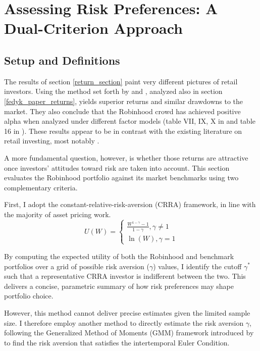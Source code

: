 \section{Assessing Risk Preferences: A Dual-Criterion Approach}
\subsection{Setup and Definitions}
The results of section \ref{return_section} paint very different pictures of retail investors. 
Using the method set forth by \cite{Welch2022} and \cite{Fedyk2024}, analyzed also in section \ref{fedyk_paper_returns}, yields superior returns and similar drawdowns to the market.
They also conclude that the Robinhood crowd has achieved positive alpha when analyzed under different factor models (table VII, IX, X in \cite{Welch2022} and table 16 in \cite{Fedyk2024}). 
These results appear to be in contrast with the existing literature on retail investing, most notably \cite{BarberOdean2000}.

A more fundamental question, however, is whether those returns are attractive once investors' attitudes toward risk are taken into account.
This section evaluates the Robinhood portfolio against its market benchmarks using two complementary criteria.

First, I adopt the constant-relative-risk-aversion (CRRA) framework, in line with the majority of asset pricing work.
\begin{equation}
    U(W) = 
    \begin{cases}
    \frac{W^{1-\gamma}-1}{1-\gamma}, \gamma\neq 1\\
    \ln(W), \gamma = 1
    \end{cases}
    \label{CRRA}
\end{equation}

By computing the expected utility of both the Robinhood and benchmark portfolios over a grid of possible risk aversion ($\gamma$) values,
I identify the cutoff $\gamma^*$ such that a representative CRRA investor is indifferent between the two.
This delivers a concise, parametric summary of how risk preferences may shape portfolio choice.

However, this method cannot deliver precise estimates given the limited sample size. 
I therefore employ another method to directly estimate the risk aversion $\gamma$, 
following the Generalized Method of Moments (GMM) framework introduced by \cite{hansen1982generalized} to find the risk aversion that satisfies the intertemporal Euler Condition.

